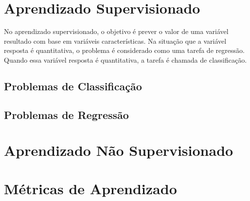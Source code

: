 \section{Aprendizado Supervisionado}

No aprendizado supervisionado, o objetivo é prever o valor de uma variável resultado com base em variáveis características. Na situação que a variável resposta é quantitativa, o problema é considerado como uma tarefa de regressão. Quando essa variável resposta é quantitativa, a tarefa é chamada de classificação.

\subsection{Problemas de Classificação}
\subsection{Problemas de Regressão}

\section{Aprendizado Não Supervisionado}

\section{Métricas de Aprendizado}

